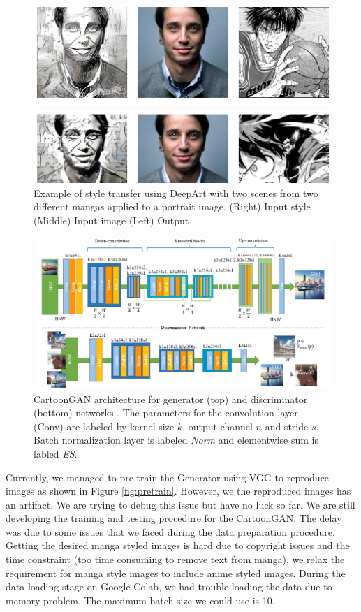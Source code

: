 \documentclass{article}
\begin{document}
\begin{figure}[b]
  \includegraphics[width=\textwidth]{figure/deepart.png}
  \caption{Example of style transfer using DeepArt with two scenes from two different mangas \cite{deepart} applied to a portrait image. (Right) Input style (Middle) Input image (Left) Output}
  \label{fig:deepart}
\end{figure}

\begin{figure}[b]
  \includegraphics[width=\textwidth]{figure/CartoonGAN.png}
  \caption{CartoonGAN architecture for generator (top) and discriminator (bottom) networks \cite{CartoonGAN}. The parameters for the convolution layer (Conv) are labeled by kernel size $k$, output channel $n$ and stride $s$. Batch normalization layer is labeled \textit{Norm} and elementwise sum is labled \textit{ES}.}
  \label{fig:architecture}
\end{figure}

Currently, we managed to pre-train the Generator using VGG to reproduce images as shown in Figure \ref{fig:pretrain}. However, we the reproduced images has an artifact. We are trying to debug this issue but have no luck so far. We are still developing the training and testing procedure for the CartoonGAN. The delay was due to some issues that we faced during the data preparation procedure. Getting the desired manga styled images is hard due to copyright issues and the time constraint (too time consuming to remove text from manga), we relax the requirement for manga style images to include anime styled images. During the data loading stage on Google Colab, we had trouble loading the data due to memory problem. The maximum batch size we could use is 10.
\end{document}
